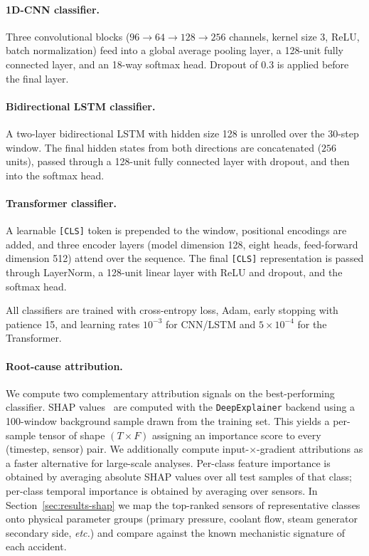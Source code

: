 \paragraph{1D-CNN classifier.} Three convolutional blocks ($96\rightarrow 64 \rightarrow 128 \rightarrow 256$ channels, kernel size 3, ReLU, batch normalization) feed into a global average pooling layer, a 128-unit fully connected layer, and an 18-way softmax head. Dropout of $0.3$ is applied before the final layer.

\paragraph{Bidirectional LSTM classifier.} A two-layer bidirectional LSTM with hidden size 128 is unrolled over the 30-step window. The final hidden states from both directions are concatenated ($256$ units), passed through a 128-unit fully connected layer with dropout, and then into the softmax head.

\paragraph{Transformer classifier.} A learnable \texttt{[CLS]} token is prepended to the window, positional encodings are added, and three encoder layers (model dimension 128, eight heads, feed-forward dimension 512) attend over the sequence. The final \texttt{[CLS]} representation is passed through LayerNorm, a 128-unit linear layer with ReLU and dropout, and the softmax head.

All classifiers are trained with cross-entropy loss, Adam, early stopping with patience 15, and learning rates $10^{-3}$ for CNN/LSTM and $5 \times 10^{-4}$ for the Transformer.

\paragraph{Root-cause attribution.} We compute two complementary attribution signals on the best-performing classifier. SHAP values~\citep{lundberg2017shap} are computed with the \texttt{DeepExplainer} backend using a 100-window background sample drawn from the training set. This yields a per-sample tensor of shape $(T \times F)$ assigning an importance score to every (timestep, sensor) pair. We additionally compute input-$\times$-gradient attributions as a faster alternative for large-scale analyses. Per-class feature importance is obtained by averaging absolute SHAP values over all test samples of that class; per-class temporal importance is obtained by averaging over sensors. In Section~\ref{sec:results-shap} we map the top-ranked sensors of representative classes onto physical parameter groups (primary pressure, coolant flow, steam generator secondary side, \textit{etc.}) and compare against the known mechanistic signature of each accident.

